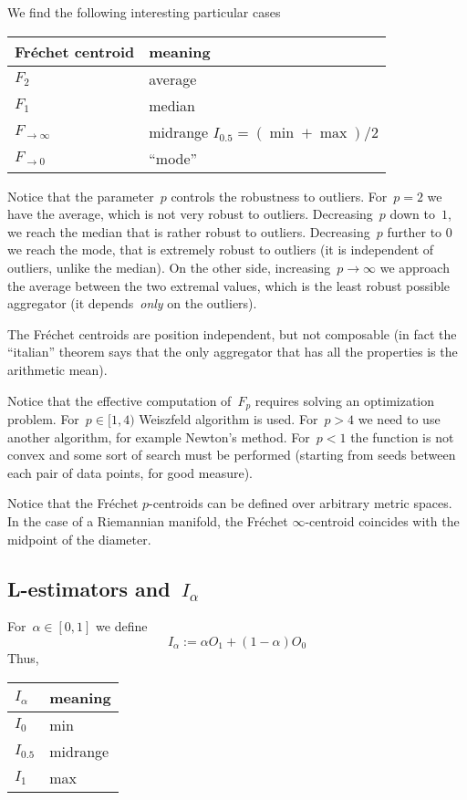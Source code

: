 \documentclass[a4paper]{article}
\begin{document}
We find the following interesting particular cases

\medskip

\begin{tabular}{l|l}
	Fréchet centroid & meaning \\
	\hline
	$F_2$ & average \\
	$F_1$ & median \\
	$F_{\to\infty}$ & midrange $I_{0.5}=(\min+\max)/2$ \\
	$F_{\to0}$ & ``mode'' \\
\end{tabular}

\medskip

Notice that the parameter~$p$ controls the robustness to outliers.
For~$p=2$ we have the average, which is not very robust to outliers.
Decreasing~$p$ down to~$1$, we reach the median that is rather robust
to outliers.  Decreasing~$p$ further to 0 we reach the mode, that is
extremely robust to outliers (it is independent of outliers, unlike
the median).  On the other side, increasing~$p\to\infty$ we approach
the average between the two extremal values, which is the least
robust possible aggregator (it depends~\emph{only} on the outliers).


The Fréchet centroids are position independent, but not composable
(in fact the ``italian'' theorem says that the only aggregator that
has all the properties is the arithmetic mean).

Notice that the effective computation of~$F_p$ requires solving an
optimization problem.  For~$p\in[1,4)$ Weiszfeld
algorithm is used.  For~$p>4$ we need to use another algorithm, for
example Newton's method.  For~$p<1$ the function is not convex and
some sort of search must be performed (starting from seeds between
each pair of data points, for good measure).

Notice that the Fréchet $p$-centroids can be defined over arbitrary
metric spaces.  In the case of a Riemannian manifold, the Fréchet
$\infty$-centroid coincides with the midpoint of the diameter.

\medskip

\subsection{L-estimators and~$I_\alpha$}

For~$\alpha\in[0,1]$ we define
\[
	I_{\alpha}:=\alpha O_1 + (1-\alpha) O_0
\]
Thus,
\medskip

\begin{tabular}{l|l}
	$I_\alpha$ & meaning \\
	\hline
	$I_0$ & min \\
	$I_{0.5}$ & midrange \\
	$I_1$ & max \\
\end{tabular}
\end{document}
